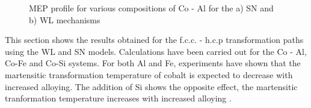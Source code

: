 \documentclass[preprint]{elsarticle}
\begin{document}
\begin{figure}[htp!]
    \centering
\caption{MEP profile for various compositions of Co - Al for the a) SN and b) WL mechanisms}
\label{fig:linear_profiles}
  \end{figure}    

This section shows the results obtained for the f.c.c. - h.c.p transformation paths using the WL and SN models. Calculations have been carried out for the Co - Al, Co-Fe and Co-Si systems. For both Al and Fe, experiments have shown that the martensitic transformation temperature of cobalt  is expected to decrease with increased alloying. The addition of Si shows the opposite effect, the martensitic tranformation temperature increases with increased alloying \cite{ma2010high}.
\end{document}
